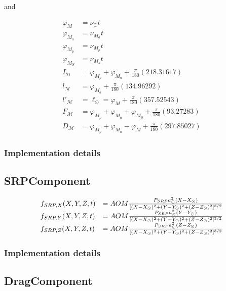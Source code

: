 \documentclass{article}
\begin{document}
and

\begin{equation}
\begin{array}{ll}
\varphi_{M}&=\nu_\odot t\\
\varphi_{M_a}&=\nu_{M_a}t\\
\varphi_{M_p}&=\nu_{M_p}t\\
\varphi_{M_S}&=\nu_{M_s}t\\
L_0&=\varphi_{M_p}+\varphi_{M_a}+ \frac{\pi}{180}(218.31617)\nonumber\\
l_{\mathcal M}&=\varphi_{M_a}+ \frac{\pi}{180}(134.96292)\nonumber\\
l'_{\mathcal M}&=\ell_{\odot}=\varphi_M+ \frac{\pi}{180} (357.52543)\\
F_{\mathcal M}&=\varphi_{M_p}+\varphi_{M_a}+\varphi_{M_S}+ \frac{\pi}{180} (93.27283)\nonumber\\
D_{\mathcal M}&=\varphi_{M_p}+\varphi_{M_a}-\varphi_{M}+ \frac{\pi}{180} (297.85027)\nonumber
\end{array}
\end{equation}

\subsubsection{Implementation details}
\subsection{SRPComponent}

\begin{equation}
\begin{array}{ll}
f_{SRP,X}(X,Y,Z,t) &= AOM
{P_{SRP}a_\odot^2(X-X_\odot)\over [(X-X_\odot)^2+(Y-Y_\odot)^2+(Z-Z_\odot)^2]^{3/2}}\\
f_{SRP,Y}(X,Y,Z,t) &= AOM
{P_{SRP}a_\odot^2(Y-Y_\odot)\over [(X-X_\odot)^2+(Y-Y_\odot)^2+(Z-Z_\odot)^2]^{3/2}}\\
f_{SRP,Z}(X,Y,Z,t) &= AOM
{P_{SRP}a_\odot^2(Z-Z_\odot)\over [(X-X_\odot)^2+(Y-Y_\odot)^2+(Z-Z_\odot)^2]^{3/2}}
\end{array}
\end{equation}

\subsubsection{Implementation details}
\subsection{DragComponent}
\end{document}
